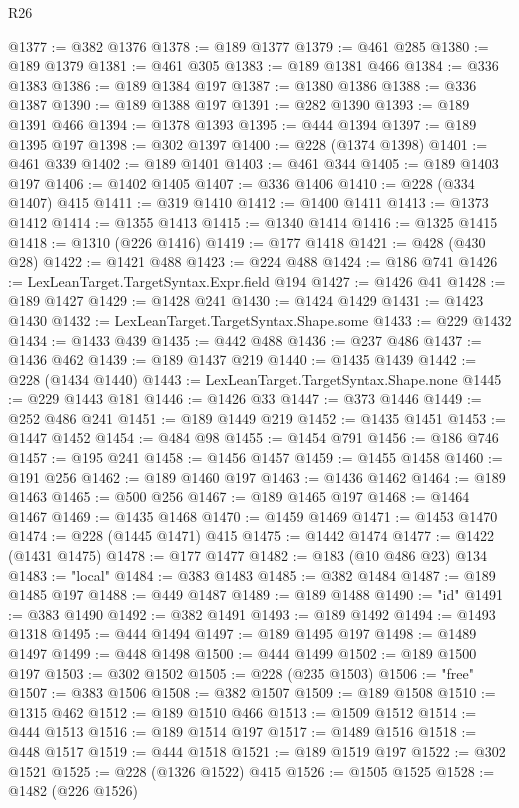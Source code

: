 \begin{lexlean}{R26}
\begin{coremodule}
@1377 := @382 @1376
@1378 := @189 @1377
@1379 := @461 @285
@1380 := @189 @1379
@1381 := @461 @305
@1383 := @189 @1381 @466
@1384 := @336 @1383
@1386 := @189 @1384 @197
@1387 := @1380 @1386
@1388 := @336 @1387
@1390 := @189 @1388 @197
@1391 := @282 @1390
@1393 := @189 @1391 @466
@1394 := @1378 @1393
@1395 := @444 @1394
@1397 := @189 @1395 @197
@1398 := @302 @1397
@1400 := @228 (@1374 @1398)
@1401 := @461 @339
@1402 := @189 @1401
@1403 := @461 @344
@1405 := @189 @1403 @197
@1406 := @1402 @1405
@1407 := @336 @1406
@1410 := @228 (@334 @1407) @415
@1411 := @319 @1410
@1412 := @1400 @1411
@1413 := @1373 @1412
@1414 := @1355 @1413
@1415 := @1340 @1414
@1416 := @1325 @1415
@1418 := @1310 (@226 @1416)
@1419 := @177 @1418
@1421 := @428 (@430 @28)
@1422 := @1421 @488
@1423 := @224 @488
@1424 := @186 @741
@1426 := LexLeanTarget.TargetSyntax.Expr.field @194
@1427 := @1426 @41
@1428 := @189 @1427
@1429 := @1428 @241
@1430 := @1424 @1429
@1431 := @1423 @1430
@1432 := LexLeanTarget.TargetSyntax.Shape.some
@1433 := @229 @1432
@1434 := @1433 @439
@1435 := @442 @488
@1436 := @237 @486
@1437 := @1436 @462
@1439 := @189 @1437 @219
@1440 := @1435 @1439
@1442 := @228 (@1434 @1440)
@1443 := LexLeanTarget.TargetSyntax.Shape.none
@1445 := @229 @1443 @181
@1446 := @1426 @33
@1447 := @373 @1446
@1449 := @252 @486 @241
@1451 := @189 @1449 @219
@1452 := @1435 @1451
@1453 := @1447 @1452
@1454 := @484 @98
@1455 := @1454 @791
@1456 := @186 @746
@1457 := @195 @241
@1458 := @1456 @1457
@1459 := @1455 @1458
@1460 := @191 @256
@1462 := @189 @1460 @197
@1463 := @1436 @1462
@1464 := @189 @1463
@1465 := @500 @256
@1467 := @189 @1465 @197
@1468 := @1464 @1467
@1469 := @1435 @1468
@1470 := @1459 @1469
@1471 := @1453 @1470
@1474 := @228 (@1445 @1471) @415
@1475 := @1442 @1474
@1477 := @1422 (@1431 @1475)
@1478 := @177 @1477
@1482 := @183 (@10 @486 @23) @134
@1483 := "local"
@1484 := @383 @1483
@1485 := @382 @1484
@1487 := @189 @1485 @197
@1488 := @449 @1487
@1489 := @189 @1488
@1490 := "id"
@1491 := @383 @1490
@1492 := @382 @1491
@1493 := @189 @1492
@1494 := @1493 @1318
@1495 := @444 @1494
@1497 := @189 @1495 @197
@1498 := @1489 @1497
@1499 := @448 @1498
@1500 := @444 @1499
@1502 := @189 @1500 @197
@1503 := @302 @1502
@1505 := @228 (@235 @1503)
@1506 := "free"
@1507 := @383 @1506
@1508 := @382 @1507
@1509 := @189 @1508
@1510 := @1315 @462
@1512 := @189 @1510 @466
@1513 := @1509 @1512
@1514 := @444 @1513
@1516 := @189 @1514 @197
@1517 := @1489 @1516
@1518 := @448 @1517
@1519 := @444 @1518
@1521 := @189 @1519 @197
@1522 := @302 @1521
@1525 := @228 (@1326 @1522) @415
@1526 := @1505 @1525
@1528 := @1482 (@226 @1526)

\end{coremodule}
\end{lexlean}
